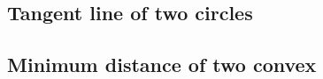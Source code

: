 \documentclass[a4paper,10pt,twocolumn,oneside]{article}
\begin{document}
%

\subsection{Tangent line of two circles}


\newpage
\subsection{Minimum distance of two convex}


%
%

%

%

% 

%

%

%
\end{document}
